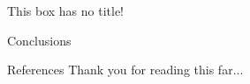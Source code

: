 \documentclass[a3,2col]{commsysposter}
\begin{document}
\begin{postercolumn}[0.7]
\begin{posterarea}[2][][0.6]
\begin{postercolumn}[0.6]
			\begin{posterbox}{}
				This box has no title!
			\end{posterbox}
			\begin{posterbox}[posterpurple]{Conclusions}
				\lipsum[6]
			\end{posterbox}
		\end{postercolumn}
	\end{posterarea}
	\begin{posterbox}{References}
		Thank you for reading this far...
	\end{posterbox}
\end{postercolumn}
\end{document}
